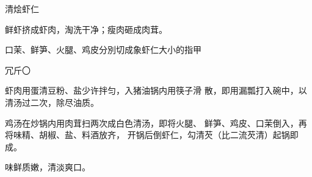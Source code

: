 \begin{recipe}{清烩虾仁}

\ingredients




\cooking

\step 	鲜虾挤成虾肉，淘洗干净；瘦肉砸成肉茸。

\step 	口茉、鲜笋、火腿、鸡皮分別切成象虾仁大小的指甲

冗斤〇

\step 	虾肉用蛋清豆粉、盐少许拌匀，入猪油锅内用筷子滑 散，即用漏瓢打入碗中，以清汤过二次，除尽油质。

\step 鸡汤在炒锅内用肉茸扫两次成白色清汤，即将火腿、 鲜笋、鸡皮、口茉倒入，再将味精、胡椒、盐、料酒放齐， 开锅后倒虾仁，勾清芡（比二流芡清）起锅即成。

\notes

味鲜质嫩，清淡爽口。

\end{recipe}

